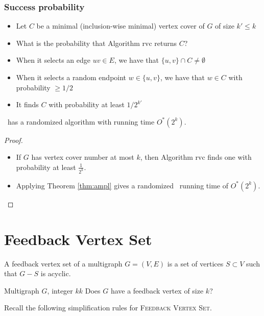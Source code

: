 \begin{frame}
	\frametitle{Success probability}
	
	\begin{itemize}
		\item Let $C$ be a minimal (inclusion-wise minimal) vertex cover of $G$ of size $k'\le k$
		\item What is the probability that Algorithm $\text{rvc}$ returns $C$?
		\item When it selects an edge $uv\in E$, we have that $\{u,v\}\cap C \ne \emptyset$
		\item When it selects a random endpoint $w\in \{u,v\}$, we have that $w\in C$ with probability $\ge 1/2$
		\item It finds $C$ with probability at least $1/2^{k'}$
	\end{itemize}
\end{frame}

\begin{frame}

\begin{theorem}
	\VC\ has a randomized algorithm with running time $O^*(2^k)$.
\end{theorem}    
    \begin{proof}
        \begin{itemize}
            \item If $G$ has vertex cover number at most $k$, then Algorithm $\text{rvc}$ finds one with probability at least $\frac{1}{2^k}$.
            \item Applying Theorem \ref{thm:ampl} gives a randomized \FPT\ running time of $O^*(2^k)$.
        \end{itemize}
    \end{proof}

\end{frame}

\section{Feedback Vertex Set}
\begin{frame}
    
A \alert{feedback vertex set} of a multigraph $G=(V,E)$ is a set of vertices $S \subset V$ such that $G-S$ is acyclic.

        {Multigraph $G$, integer $k$}{$k$}
        {Does $G$ have a feedback vertex of size $k$?}

    \pause
    \noindent
    Recall the following simplification rules for \textsc{Feedback Vertex Set}.
\end{frame}

